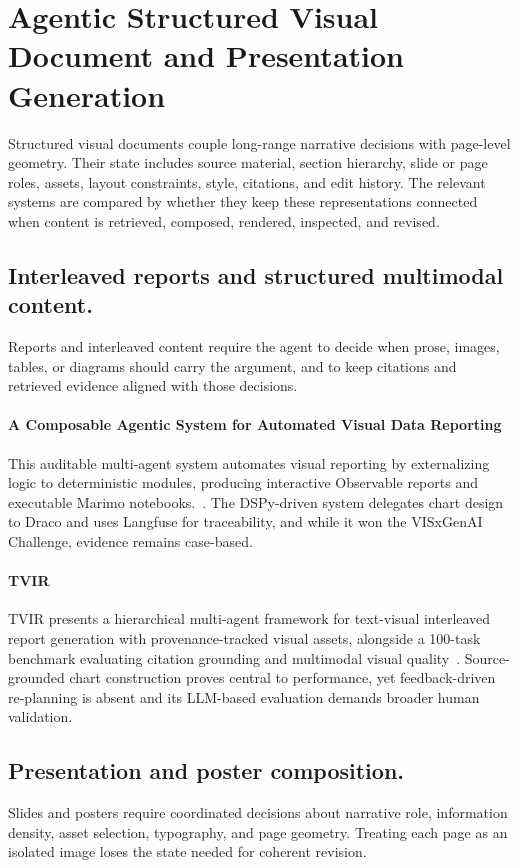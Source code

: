 \section{Agentic Structured Visual Document and Presentation Generation}
\label{sec:structured-documents}

Structured visual documents couple long-range narrative decisions with page-level geometry. Their state includes source material, section hierarchy, slide or page roles, assets, layout constraints, style, citations, and edit history. The relevant systems are compared by whether they keep these representations connected when content is retrieved, composed, rendered, inspected, and revised.

\subsection{Interleaved reports and structured multimodal content.}
Reports and interleaved content require the agent to decide when prose, images, tables, or diagrams should carry the argument, and to keep citations and retrieved evidence aligned with those decisions.

\paragraph{A Composable Agentic System for Automated Visual Data Reporting}
This auditable multi-agent system automates visual reporting by externalizing logic to deterministic modules, producing interactive Observable reports and executable Marimo notebooks.~\cite{avg250905721}. The DSPy-driven system delegates chart design to Draco and uses Langfuse for traceability, and while it won the VISxGenAI Challenge, evidence remains case-based.

\paragraph{TVIR}
TVIR presents a hierarchical multi-agent framework for text-visual interleaved report generation with provenance-tracked visual assets, alongside a 100-task benchmark evaluating citation grounding and multimodal visual quality~\cite{avg260602320}.  Source-grounded chart construction proves central to performance, yet feedback-driven re-planning is absent and its LLM-based evaluation demands broader human validation.

\subsection{Presentation and poster composition.}
Slides and posters require coordinated decisions about narrative role, information density, asset selection, typography, and page geometry. Treating each page as an isolated image loses the state needed for coherent revision.

